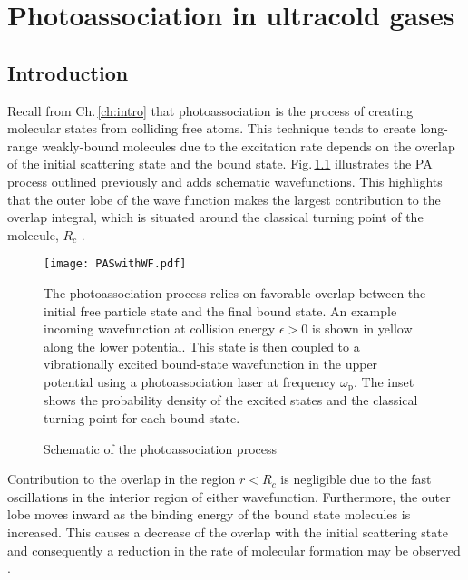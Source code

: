 \chapter{Photoassociation in ultracold gases} \label{ch:chap3}
\section{Introduction} \label{sec:pas_intro}
Recall from Ch.\,\ref{ch:intro} that photoassociation is the process of creating molecular states from colliding free atoms.
This technique tends to create long-range weakly-bound molecules due to the excitation rate depends on the overlap of the initial scattering state and the bound state.
Fig.\,\ref{fig:3pasSch} illustrates the PA process outlined previously and adds schematic wavefunctions.
This highlights that the outer lobe of the wave function makes the largest contribution to the overlap integral, which is situated around the classical turning point of the molecule, $R_c$ \cite{Bohn1999,bav00}.
\begin{figure}
	\centerline{
	\texttt{[image: PASwithWF.pdf]}}
	\caption{Schematic of the photoassociation process}{The photoassociation process relies on favorable overlap between the initial free particle state and the final bound state. An example incoming wavefunction at collision energy $\epsilon > 0$ is shown in yellow along the lower potential. This state is then coupled to a vibrationally excited bound-state wavefunction in the upper potential using a photoassociation laser at frequency $\omega_\text{p}$. The inset shows the probability density of the excited states and the classical turning point for each bound state.}
	\label{fig:3pasSch}
\end{figure}
Contribution to the overlap in the region $r < R_c$ is negligible due to the fast oscillations in the interior region of either wavefunction.
Furthermore, the outer lobe moves inward as the binding energy of the bound state molecules is increased. 
This causes a decrease of the overlap with the initial scattering state and consequently a reduction in the rate of molecular formation may be observed \cite{Krems2009a,Julienne2009a,nse06,Jones2006}.


